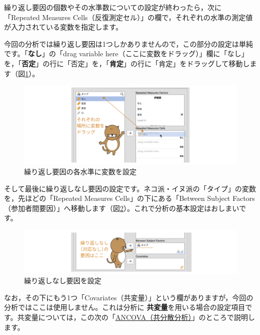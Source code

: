 \documentclass[
  12pt,
  a5jpaper,
  lualatex, ja=standard]{bxjsbook}
\renewcommand{\emph}[1]{\textbf{\color{emph} #1}}
\begin{document}
繰り返し要因の個数やその水準数についての設定が終わったら，次に「Repeated Measures Cells（反復測定セル）」の欄で，それぞれの水準の測定値が入力されている変数を指定します。

今回の分析では繰り返し要因は1つしかありませんので，この部分の設定は単純です。「\textbf{なし}」の「drag variable here（ここに変数をドラッグ）」欄に「なし」を，「\textbf{否定}」の行に「否定」を，「\textbf{肯定}」の行に「肯定」をドラッグして移動します（図\ref{fig:ANOVA-rm-rmcells}）。

\begin{figure}[!ht]

{\centering \includegraphics[width=1\linewidth]{images/ANOVA/rm-rmcells} 

}

\caption{繰り返し要因の各水準に変数を設定}\label{fig:ANOVA-rm-rmcells}
\end{figure}

そして最後に繰り返しなし要因の設定です。ネコ派・イヌ派の「タイプ」の変数を，先ほどの「Repeated Measures Cells」の下にある「Between Subject Factors（参加者間要因）」へ移動します（図\ref{fig:ANOVA-rm-between-subject-factors}）。これで分析の基本設定はおしまいです。

\begin{figure}[!ht]

{\centering \includegraphics[width=1\linewidth]{images/ANOVA/rm-between-subject-factors} 

}

\caption{繰り返しなし要因を設定}\label{fig:ANOVA-rm-between-subject-factors}
\end{figure}

なお，その下にもう1つ「Covariates（共変量）」という欄がありますが，今回の分析ではここは使用しません。これは分析に\emph{共変量}を用いる場合の設定項目です。共変量については，この次の「\protect\hyperlink{sec:ANOVA-ancova}{ANCOVA（共分散分析）}」のところで説明します。
\end{document}
